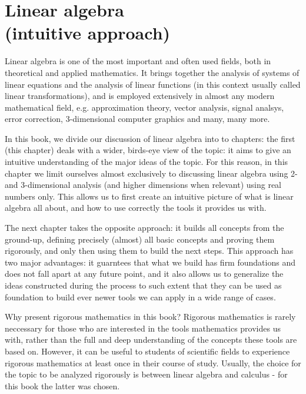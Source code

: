 \chapter{Linear algebra\\(intuitive approach)}\label{chapter:linear algebra intuitive}
Linear algebra is one of the most important and often used fields, both in theoretical and applied mathematics. It brings together the analysis of systems of linear equations and the analysis of linear functions (in this context usually called linear transformations), and is employed extensively in almost any modern mathematical field, e.g. approximation theory, vector analysis, signal analsys, error correction, 3-dimensional computer graphics and many, many more.

In this book, we divide our discussion of linear algebra into to chapters: the first (this chapter) deals with a wider, birds-eye view of the topic: it aims to give an intuitive understanding of the major ideas of the topic. For this reason, in this chapter we limit ourselves almost exclusively to discussing linear algebra using 2- and 3-dimensional analysis (and higher dimensions when relevant) using real numbers only. This allows us to first create an intuitive picture of what is linear algebra all about, and how to use correctly the tools it provides us with.

The next chapter takes the opposite approach: it builds all concepts from the ground-up, defining precisely (almost) all basic concepts and proving them rigorously, and only then using them to build the next steps. This approach has two major advantages: it guarntees that what we build has firm foundations and does not fall apart at any future point, and it also allows us to generalize the ideas constructed during the process to such extent that they can be used as foundation to build ever newer tools we can apply in a wide range of cases.

\begin{note}{Why present rigorous mathematics in this book?}{ }
	Rigorous mathematics is rarely neccessary for those who are interested in the tools mathematics provides us with, rather than the full and deep understanding of the concepts these tools are based on. However, it can be useful to students of scientific fields to experience rigorous mathematics at least once in their course of study. Usually, the choice for the topic to be analyzed rigorously is between linear algebra and calculus - for this book the latter was chosen.
\end{note}
